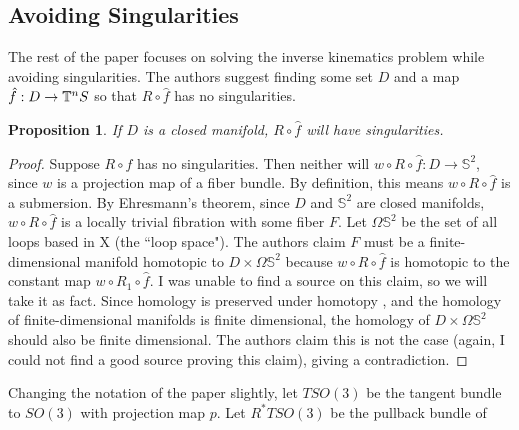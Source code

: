 \documentclass[12pt]{article}
\newtheorem{prop}{Proposition}
\theoremstyle{definition}
\begin{document}
\subsection{Avoiding Singularities}
The rest of the paper focuses on solving the inverse kinematics problem while
avoiding singularities. 
The authors suggest finding some set \(D\) and a map \(\hat{f} : D \rightarrow
\mathbb{T}^n \\ S\) so that \(R \circ \hat{f}\) has no singularities.

\begin{prop}
    If \(D\) is a closed manifold, \(R \circ \hat{f}\) will have singularities.
\end{prop}
\begin{proof}
    Suppose \(R \circ \hat{f}\) has no singularities. Then neither will 
    \(w \circ R \circ \hat{f} : D \rightarrow \mathbb{S}^2\), since \(w\) is a
    projection map of a fiber bundle. By definition, 
    this means \(w \circ R \circ \hat{f}\) is a submersion.
    By Ehresmann's theorem, since \(D\) and \(\mathbb{S}^2\) are closed
    manifolds, \(w \circ R \circ \hat{f}\) is a locally trivial fibration with
    some fiber \(F\).
    Let \(\Omega\mathbb{S}^2\) be the set of all loops based in X (the ``loop
    space").
    The authors claim \(F\) must be a finite-dimensional manifold homotopic to
    \(D \times \Omega\mathbb{S}^2\) because \(w \circ R \circ \hat{f}\) is
    homotopic to the constant map \(w \circ R_1 \circ \hat{f}\). I was unable to
    find a source on this claim, so we will take it as fact.
    Since homology is preserved under homotopy \cite{intro-top-manifolds}, and
    the homology of finite-dimensional manifolds is finite dimensional, the
    homology of \(D \times \Omega\mathbb{S}^2\) should also be finite
    dimensional. The authors claim this is not the case (again, I could not find
    a good source proving this claim), giving a contradiction.
\end{proof}

Changing the notation of the paper slightly, let \(TSO(3)\) be the tangent
bundle to \(SO(3)\) with projection map \(p\). 
Let \(R^*TSO(3)\) be the pullback bundle of 


\printbibliography
\end{document}
